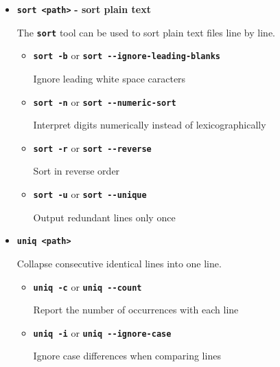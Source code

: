 \documentclass[aspectratio=1610]{beamer}
\newcommand\curtitle{}
\newcommand\command[1]{\alert{\textbf{\texttt{#1}}}}
\begin{document}

\begin{frame}[c]{\curtitle}
    \begin{itemize}[<+->]\setlength\itemsep{1em}
        \item \command{sort <path>} \textbf{- sort plain text} 

            The \command{sort} tool can be used to sort plain text files line by line.
            \begin{itemize}[<.->]
                \item \command{sort -b} or \command{sort -{-}ignore-leading-blanks}

                    Ignore leading white space caracters
                \item \command{sort -n} or \command{sort -{-}numeric-sort}

                    Interpret digits numerically instead of lexicographically
                \item \command{sort -r} or \command{sort -{-}reverse}

                    Sort in reverse order
                \item \command{sort -u} or \command{sort -{-}unique}

                    Output redundant lines only once
            \end{itemize}
    \end{itemize}
\end{frame}


\begin{frame}[c]{\curtitle}
    \begin{itemize}[<+->]\setlength\itemsep{1em}
        \item \command{uniq <path>}

            Collapse consecutive identical lines into one line.
            \begin{itemize}[<.->]
                \item \command{uniq -c} or \command{uniq -{-}count}

                    Report the number of occurrences with each line
                \item \command{uniq -i} or \command{uniq -{-}ignore-case}

                    Ignore case differences when comparing lines
            \end{itemize}
    \end{itemize}
\end{frame}
\end{document}
